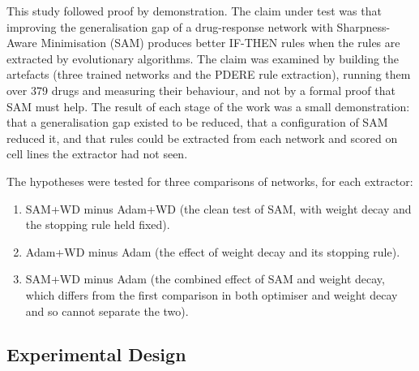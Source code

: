 \label{sec:methodology}

This study followed proof by demonstration. The claim under test was that improving the generalisation gap of a drug-response network with Sharpness-Aware Minimisation (SAM) produces better IF-THEN rules when the rules are extracted by evolutionary algorithms. The claim was examined by building the artefacts (three trained networks and the PDERE rule extraction), running them over 379 drugs and measuring their behaviour, and not by a formal proof that SAM must help. The result of each stage of the work was a small demonstration: that a generalisation gap existed to be reduced, that a configuration of SAM reduced it, and that rules could be extracted from each network and scored on cell lines the extractor had not seen.

The hypotheses were tested for three comparisons of networks, for each extractor:

\begin{enumerate}
  \item SAM+WD minus Adam+WD (the clean test of SAM, with weight decay and the stopping rule held fixed).
  \item Adam+WD minus Adam (the effect of weight decay and its stopping rule).
  \item SAM+WD minus Adam (the combined effect of SAM and weight decay, which differs from the first comparison in both optimiser and weight decay and so cannot separate the two).
\end{enumerate}

\subsection{Experimental Design}
\label{sec:design}

